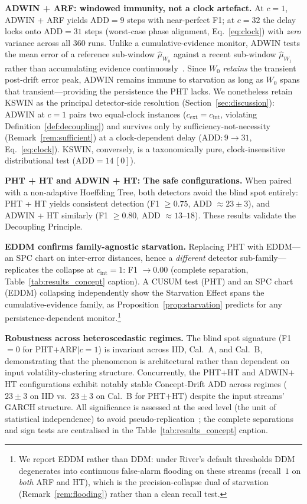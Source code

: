 \documentclass[10pt,conference]{IEEEtran}
\theoremstyle{definition}
\begin{document}
\textbf{ADWIN + ARF: windowed immunity, not a clock artefact.}
At $c = 1$, ADWIN + ARF yields $\mathrm{ADD} = 9$ steps with near-perfect F1; at $c = 32$ the delay locks onto $\mathrm{ADD} = 31$ steps (worst-case phase alignment, Eq.~\eqref{eq:clock}) with \emph{zero} variance across all 360 runs.
Unlike a cumulative-evidence monitor, ADWIN tests the mean error of a reference sub-window $\hat{\mu}_{W_0}$ against a recent sub-window $\hat{\mu}_{W_1}$ rather than accumulating evidence continuously~\cite{bifet_adwin_2007}.
Since $W_0$ \emph{retains} the transient post-drift error peak, ADWIN remains immune to starvation as long as $W_0$ spans that transient---providing the persistence the PHT lacks.
We nonetheless retain KSWIN as the principal detector-side resolution (Section~\ref{sec:discussion}): ADWIN at $c = 1$ pairs two equal-clock instances ($c_{\mathrm{ext}} = c_{\mathrm{int}}$, violating Definition~\ref{def:decoupling}) and survives only by sufficiency-not-necessity (Remark~\ref{rem:sufficient}) at a clock-dependent delay ($\mathrm{ADD}: 9 \to 31$, Eq.~\eqref{eq:clock}). KSWIN, conversely, is a taxonomically pure, clock-insensitive distributional test ($\mathrm{ADD} = 14\,[0]$).

\textbf{PHT + HT and ADWIN + HT: The safe configurations.}
When paired with a non-adaptive Hoeffding Tree, both detectors avoid the blind spot entirely: PHT + HT yields consistent detection (F1 $\ge 0.75$, ADD $\approx 23 \pm 3$), and ADWIN + HT similarly (F1 $\ge 0.80$, ADD $\approx 13$--$18$).
These results validate the Decoupling Principle.

\textbf{EDDM confirms family-agnostic starvation.}
Replacing PHT with EDDM---an SPC chart on inter-error distances, hence a \emph{different} detector sub-family---replicates the collapse at $c_{\mathrm{int}} = 1$: F1 $\to 0.00$ (complete separation, Table~\ref{tab:results_concept} caption). A CUSUM test (PHT) and an SPC chart (EDDM) collapsing independently show the Starvation Effect spans the cumulative-evidence family, as Proposition~\ref{prop:starvation} predicts for any persistence-dependent monitor.\footnote{We report EDDM rather than DDM: under River's default thresholds DDM degenerates into continuous false-alarm flooding on these streams (recall~$1$ on \emph{both} ARF and HT), which is the precision-collapse dual of starvation (Remark~\ref{rem:flooding}) rather than a clean recall test.}

\textbf{Robustness across heteroscedastic regimes.}
The blind spot signature (F1${=}0$ for PHT$+$ARF$|c{=}1$) is invariant across IID, Cal.~A, and Cal.~B, demonstrating that the phenomenon is architectural rather than dependent on input volatility-clustering structure.
Concurrently, the PHT$+$HT and ADWIN$+$HT configurations exhibit notably stable Concept-Drift ADD across regimes ($23 \pm 3$ on IID vs.\ $23 \pm 3$ on Cal.~B for PHT$+$HT) despite the input streams' GARCH structure.
All significance is assessed at the seed level (the unit of statistical independence) to avoid pseudo-replication~\cite{demsar_statistical_2006}; the complete separations and sign tests are centralised in the Table~\ref{tab:results_concept} caption.
\end{document}
